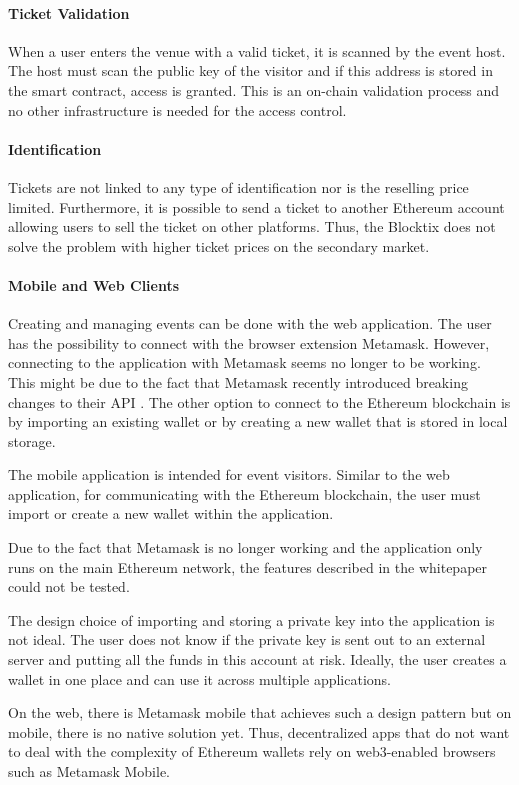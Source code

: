\paragraph{Ticket Validation}
When a user enters the venue with a valid ticket, it is scanned by the event host. The host must scan the public key of the visitor and if this address is stored in the smart contract, access is granted. This is an on-chain validation process and no other infrastructure is needed for the access control.

\paragraph{Identification}
Tickets are not linked to any type of identification nor is the reselling price limited. Furthermore, it is possible to send a ticket to another Ethereum account allowing users to sell the ticket on other platforms. Thus, the Blocktix does not solve the problem with higher ticket prices on the secondary market. 

\paragraph{Mobile and Web Clients}
Creating and managing events can be done with the web application. The user has the possibility to connect with the browser extension Metamask. However, connecting to the application with Metamask seems no longer to be working. This might be due to the fact that Metamask recently introduced breaking changes to their API \cite{metamask-breaking-changes}. The other option to connect to the Ethereum blockchain is by importing an existing wallet or by creating a new wallet that is stored in local storage. 

The mobile application is intended for event visitors. Similar to the web application, for communicating with the Ethereum blockchain, the user must import or create a new wallet within the application.

Due to the fact that Metamask is no longer working and the application only runs on the main Ethereum network, the features described in the whitepaper could not be tested.

The design choice of importing and storing a private key into the application is not ideal. The user does not know if the private key is sent out to an external server and putting all the funds in this account at risk. Ideally, the user creates a wallet in one place and can use it across multiple applications.

On the web, there is Metamask mobile that achieves such a design pattern but on mobile, there is no native solution yet. Thus, decentralized apps that do not want to deal with the complexity of Ethereum wallets rely on web3-enabled browsers such as Metamask Mobile. 
